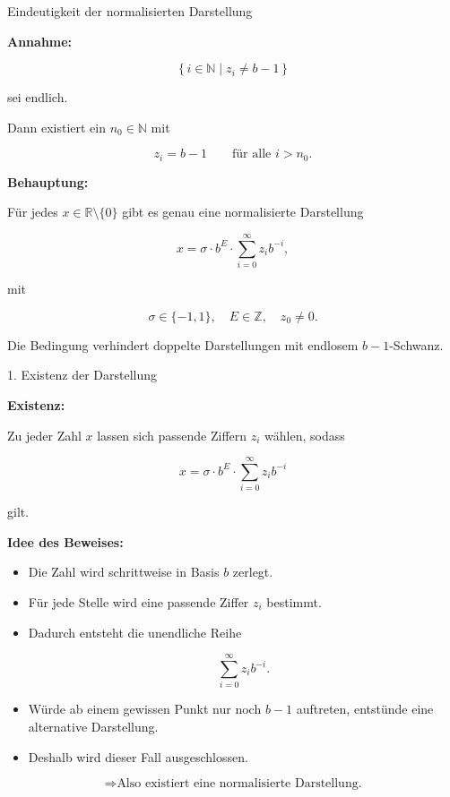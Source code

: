 \documentclass{beamer}
\newcommand{\Z}{\mathbb{Z}}
\newcommand{\R}{\mathbb{R}}
\newcommand{\N}{\mathbb{N}}
\begin{document}
\begin{frame}{Eindeutigkeit der normalisierten Darstellung}

\small

\textbf{Annahme:}

\[
\{\, i\in\N \mid z_i\neq b-1 \,\}
\]

sei endlich.

Dann existiert ein \(n_0\in\N\) mit

\[
z_i=b-1
\qquad \text{für alle } i>n_0.
\]

\vspace{0.4cm}

\textbf{Behauptung:}

Für jedes \(x\in\R\setminus\{0\}\) gibt es genau eine normalisierte Darstellung

\[
x=\sigma \cdot b^E \cdot \sum_{i=0}^{\infty} z_i b^{-i},
\]

mit

\[
\sigma\in\{-1,1\},\quad E\in\Z,\quad z_0\neq 0.
\]

Die Bedingung verhindert doppelte Darstellungen mit endlosem \(b-1\)-Schwanz.

\end{frame}

\begin{frame}{1. Existenz der Darstellung}

\textbf{Existenz:}

Zu jeder Zahl \(x\) lassen sich passende Ziffern \(z_i\) wählen, sodass

\[
x=\sigma \cdot b^E \cdot \sum_{i=0}^{\infty} z_i b^{-i}
\]

gilt.

\vspace{0.5cm}

\textbf{Idee des Beweises:}

\begin{itemize}
    \item Die Zahl wird schrittweise in Basis \(b\) zerlegt.
    
    \item Für jede Stelle wird eine passende Ziffer \(z_i\) bestimmt.
    
    \item Dadurch entsteht die unendliche Reihe
    
    \[
    \sum_{i=0}^{\infty} z_i b^{-i}.
    \]
    
    \item Würde ab einem gewissen Punkt nur noch \(b-1\) auftreten, entstünde eine alternative Darstellung.
    
    \item Deshalb wird dieser Fall ausgeschlossen.
\end{itemize}

\vspace{0.5cm}

\[
\Rightarrow \text{Also existiert eine normalisierte Darstellung.}
\]

\end{frame}
\end{document}
